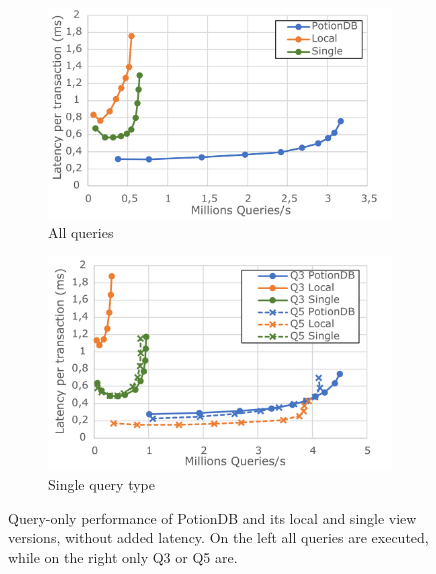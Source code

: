 \documentclass[sigplan,10pt]{acmart}
\begin{document}
\begin{figure}[h]
	\centering
	\begin{subfigure}{.5\linewidth}
		\centering
		\includegraphics[width=.9\linewidth]{clientScale_cut}
		\caption{All queries}
		\label{fig:(new)global_local_single}
	\end{subfigure}%
	\begin{subfigure}{.5\linewidth}
		\centering
		\includegraphics[width=.9\linewidth]{Q3vsQ5_cut}
		\caption{Single query type}
		\label{fig:(new)q3q5}
	\end{subfigure}
	\caption{Query-only performance of PotionDB and its local and single view versions, without added latency. On the left all queries are executed, while on the right only Q3 or Q5 are.}
	\label{fig:(new)query_only}
\end{figure}
\end{document}
